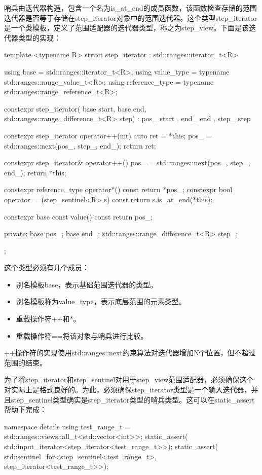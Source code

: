 哨兵由迭代器构造，包含一个名为is_at_end的成员函数，该函数检查存储的范围迭代器是否等于存储在step_iterator对象中的范围迭代器。这个类型step_iterator是一个类模板，定义了范围适配器的迭代器类型，称之为step_view。下面是该迭代器类型的实现：

\begin{cppcode}
template <typename R>
struct step_iterator : std::ranges::iterator_t<R>
{
	using base
		= std::ranges::iterator_t<R>;
	using value_type
		= typename std::ranges::range_value_t<R>;
	using reference_type
		= typename std::ranges::range_reference_t<R>;
		
	constexpr step_iterator(
		base start, base end,
		std::ranges::range_difference_t<R> step) :
		pos_{ start }, end_{ end }, step_{ step }
	{
	}

	constexpr step_iterator operator++(int)
	{
		auto ret = *this;
		pos_ = std::ranges::next(pos_, step_, end_);
		return ret;
	}

	constexpr step_iterator& operator++()
	{
		pos_ = std::ranges::next(pos_, step_, end_);
		return *this;
	}

	constexpr reference_type operator*() const
	{
		return *pos_;
	}
	constexpr bool operator==(step_sentinel<R> s) const
	{
		return s.is_at_end(*this);
	}

	constexpr base const value() const { return pos_; }
	
private:
	base pos_;
	base end_;
	std::ranges::range_difference_t<R> step_;
};
\end{cppcode}

这个类型必须有几个成员：

\begin{itemize}
  \item 别名模板base，表示基础范围迭代器的类型。
  \item 别名模板称为value_type，表示底层范围的元素类型。
  \item 重载操作符++和*。
  \item 重载操作符==将该对象与哨兵进行比较。
\end{itemize}

++操作符的实现使用std::ranges::next约束算法对迭代器增加N个位置，但不超过范围的结束。

为了将step_iterator和step_sentinel对用于step_view范围适配器，必须确保这个对实际上是格式良好的。为此，必须确保step_iterator类型是一个输入迭代器，并且step_sentinel类型确实是step_iterator类型的哨兵类型。这可以在static_assert帮助下完成：

\begin{cppcode}
namespace details
{
	using test_range_t =
		std::ranges::views::all_t<std::vector<int>>;
	static_assert(
		std::input_iterator<step_iterator<test_range_t>>);
	static_assert(
		std::sentinel_for<step_sentinel<test_range_t>,
		step_iterator<test_range_t>>);
}
\end{cppcode}

